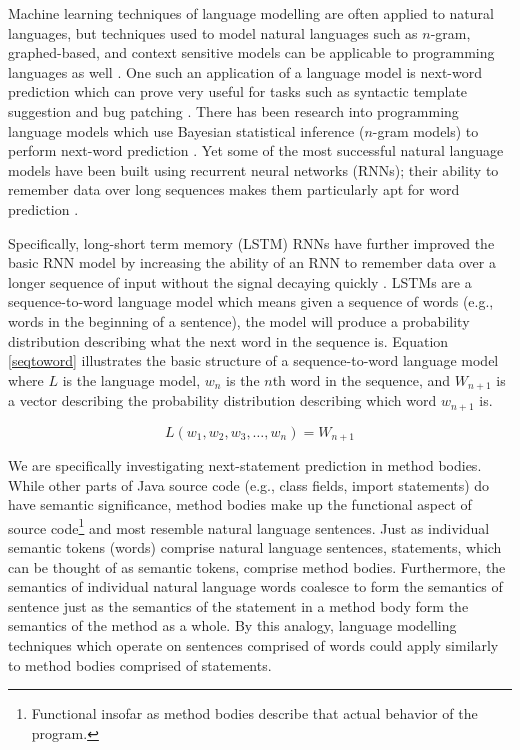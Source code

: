 \documentclass{article}
\begin{document}
Machine learning techniques of language modelling are often applied
to natural languages, but techniques used to model natural languages
such as $n$-gram, graphed-based, and context sensitive models
can be applicable to programming languages as well
\cite{Allamanis} \cite{Nguyen} \cite{Asaduzzaman}.
One such an application of a language model is next-word prediction
which can prove very useful for tasks such as syntactic template
suggestion and bug patching
\cite{Nguyen} \cite{Kim}.
There has been research into programming language models
which use Bayesian statistical inference ($n$-gram models)
to perform next-word prediction \cite{Allamanis}.
Yet some of the most successful natural language models have been
built using recurrent neural networks (RNNs); their ability to
remember data over long sequences makes them particularly apt for
word prediction \cite{LSTMArticle}.

Specifically, long-short term memory (LSTM) RNNs have further improved
the basic RNN model by increasing the ability of an RNN to remember
data over a longer sequence of input without the signal decaying
quickly \cite{LSTMArticle}. LSTMs are a sequence-to-word language
model which means given a sequence of words (e.g., words in the
beginning of a sentence), the model will produce a probability
distribution describing what the next word in the sequence is.
Equation \ref{seqtoword} illustrates the basic structure of a
sequence-to-word language model where $L$ is the language model,
$w_n$ is the $n$th word in the sequence, and $W_{n+1}$ is a vector
describing the probability distribution describing which word $w_{n+1}$
is.

\begin{equation}
\label{seqtoword}
    L(w_1, w_2, w_3, \dots, w_n) = W_{n+1}
\end{equation}

We are specifically investigating next-statement prediction in method
bodies. While other parts of Java source code (e.g., class fields,
import statements) do have semantic significance, method bodies make up
the functional aspect of source code\footnote{
Functional insofar as method bodies describe that actual
behavior of the program.} and most resemble natural language sentences.
Just as individual semantic tokens (words) comprise natural language
sentences, statements, which can be thought of as semantic tokens,
comprise method bodies. Furthermore, the semantics of individual natural
language words coalesce to form the semantics of sentence just as the
semantics of the statement in a method body form the semantics of the
method as a whole. By this analogy, language modelling techniques which
operate on sentences comprised of words could apply similarly to method
bodies comprised of statements.
\end{document}
